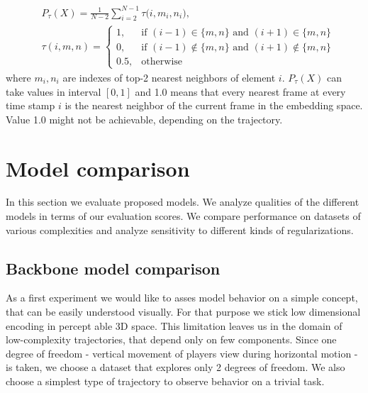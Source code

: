 \begin{equation}
  \begin{aligned}
  & P_{\tau}(X) = \frac{1}{N-2}\sum^{N-1}_{i=2}{\tau  \big(i, m_i, n_i) },\\
  & \tau(i, m, n) =
\begin{cases}
  1, & \mbox{if } (i-1) \in \{m, n\}  \mbox{ and }  (i+1) \in \{m, n\}  \\
  0, & \mbox{if } (i-1) \notin \{m, n\}  \mbox{ and }  (i+1) \notin \{m, n\} \\
  0.5, & \mbox{otherwise }
\end{cases}
\end{aligned}
\end{equation}
where $m_i, n_i$ are indexes of top-2 nearest neighbors of element $i$.  $P_{\tau}(X)$ can take values in interval $[0, 1]$ and 1.0 means that every nearest frame at every time stamp $i$ is the nearest neighbor of the current frame in the embedding space. Value 1.0 might not be achievable, depending on the trajectory.


\section{Model comparison}

In this section we evaluate proposed models. We analyze qualities of the different models in terms of our evaluation scores. We compare performance on datasets of various complexities and analyze sensitivity to different kinds of regularizations.

\subsection{Backbone model comparison}

As a first experiment we would like to asses model behavior on a simple concept, that can be easily understood visually. For that purpose we stick low dimensional encoding in percept able 3D space. This limitation leaves us in the domain of low-complexity trajectories, that depend only on few components. Since one degree of freedom - vertical movement of players view during horizontal motion - is taken, we choose a dataset that explores only 2 degrees of freedom. We also choose a simplest type of trajectory to observe behavior on a trivial task.

